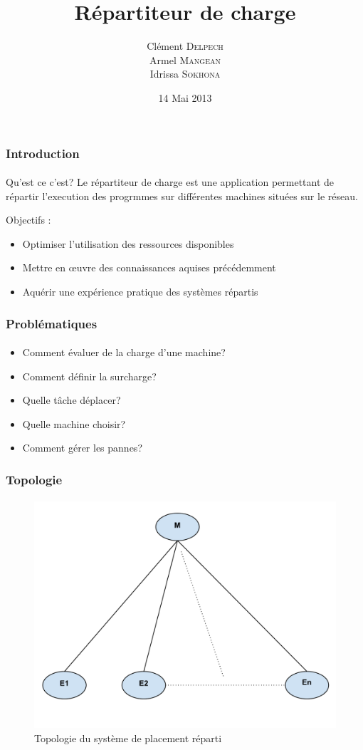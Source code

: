 \documentclass{beamer}
\title{Répartiteur de charge}
\author{%
  Clément \textsc{Delpech} \\
  Armel   \textsc{Mangean} \\
  Idrissa \textsc{Sokhona}
}
\institute{Universtié Pierre et Marie Curie}
\date{
  14 Mai 2013 
}
\begin{document}
  \begin{frame}
    \titlepage
  \end{frame}

  \begin{frame}
    \frametitle{Introduction}
    \framesubtitle{}
    \begin{block}{Qu'est ce c'est?}
      Le répartiteur de charge est une application permettant de répartir
      l'execution des progrmmes sur différentes machines situées sur le 
      réseau.
    \end{block}
    
    Objectifs :
    \begin{itemize}
       \item Optimiser l'utilisation des ressources disponibles
       \item Mettre en \oe{}uvre des connaissances aquises précédemment
       \item Aquérir une expérience pratique des systèmes répartis 
     \end{itemize}
  \end{frame}
  
  
  \begin{frame}
    \frametitle{Problématiques}
    \framesubtitle{}
    \begin{itemize}
      \item Comment évaluer de la charge d'une machine?
      \item Comment définir la surcharge?
      \item Quelle tâche déplacer?
      \item Quelle machine choisir?
      \item Comment gérer les pannes?
    \end{itemize}
  \end{frame}
  
  \begin{frame}
    \frametitle{Topologie}
    \framesubtitle{}
      \begin{figure}[h!]
        \centering
        \includegraphics[scale=0.3]{img/topologie.pdf}
        \caption{Topologie du système de placement réparti}
      \end{figure}
  \end{frame}
  
\end{document}
